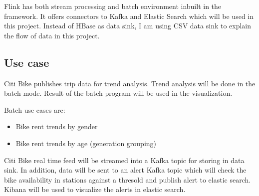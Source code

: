 \documentclass{sig-alternate-05-2015}
\begin{document}
Flink has both stream processing and batch environment inbuilt in the framework. It offers connectors to Kafka and Elastic Search which will be used in this project. Instead of HBase as data sink, I am using CSV data sink to explain the flow of data in this project. 

\subsection{Use case}

Citi Bike publishes trip data for trend analysis. Trend analysis will be done in the batch mode. Result of the batch program will be used in the visualization.

Batch use cases are:
\begin{itemize}
    \item Bike rent trends by gender
    \item Bike rent trends by age (generation grouping)
\end{itemize}

Citi Bike real time feed will be streamed into a Kafka topic for storing in data sink. In addition, data will be sent to an alert Kafka topic which will check the bike availability in stations against a thresold and publish alert to elastic search. Kibana will be used to visualize the alerts in elastic search.
\end{document}
